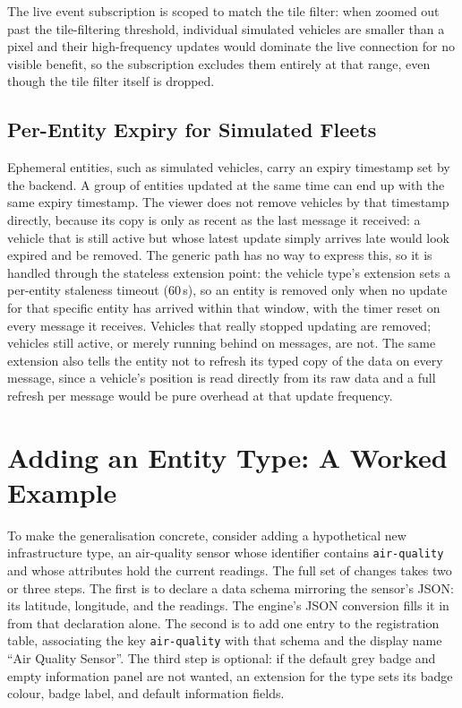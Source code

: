 The live event subscription is scoped to match the tile filter: when zoomed out past the tile-filtering threshold, individual simulated vehicles are smaller than a pixel and their high-frequency updates would dominate the live connection for no visible benefit, so the subscription excludes them entirely at that range, even though the tile filter itself is dropped.

\subsection{Per-Entity Expiry for Simulated Fleets}
\label{sec:impl-ttl}

Ephemeral entities, such as simulated vehicles, carry an expiry timestamp set by the backend. A group of entities updated at the same time can end up with the same expiry timestamp. The viewer does not remove vehicles by that timestamp directly, because its copy is only as recent as the last message it received: a vehicle that is still active but whose latest update simply arrives late would look expired and be removed. The generic path has no way to express this, so it is handled through the stateless extension point: the vehicle type's extension sets a per-entity staleness timeout (60\,s), so an entity is removed only when no update for that specific entity has arrived within that window, with the timer reset on every message it receives. Vehicles that really stopped updating are removed; vehicles still active, or merely running behind on messages, are not. The same extension also tells the entity not to refresh its typed copy of the data on every message, since a vehicle's position is read directly from its raw data and a full refresh per message would be pure overhead at that update frequency.

\section{Adding an Entity Type: A Worked Example}
\label{sec:impl-worked-example}

To make the generalisation concrete, consider adding a hypothetical new infrastructure type, an air-quality sensor whose identifier contains \texttt{air-quality} and whose attributes hold the current readings. The full set of changes takes two or three steps. The first is to declare a data schema mirroring the sensor's JSON: its latitude, longitude, and the readings. The engine's JSON conversion fills it in from that declaration alone. The second is to add one entry to the registration table, associating the key \texttt{air-quality} with that schema and the display name ``Air Quality Sensor''. The third step is optional: if the default grey badge and empty information panel are not wanted, an extension for the type sets its badge colour, badge label, and default information fields.

